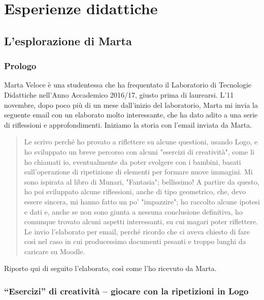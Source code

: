 \part{Esperienze didattiche} \label{parte:esperienze-didattiche}

\chapter{L'esplorazione di Marta} \label{cap:marta}

\section{Prologo}

Marta Veloce è una studentessa che ha frequentato il Laboratorio di Tecnologie
Didattiche nell'Anno Accademico 2016/17, giusto prima di laurearsi. L'11
novembre, dopo poco più di un mese dall'inizio del laboratorio, Marta mi
invia la seguente email con un elaborato molto interessante, che ha dato adito
a una serie di riflessioni e approfondimenti. Iniziamo la storia con l'email
inviata da Marta.

\begin{quote} Le scrivo perché ho provato a riflettere su alcune questioni,
	usando Logo, e ho sviluppato un breve percorso con alcuni "esercizi di
	creatività", come li ho chiamati io, eventualmente da poter svolgere
	con i bambini, basati sull'operazione di ripetizione di elementi per
	formare nuove immagini. Mi sono ispirata al libro di Munari\cite{Munari},
	"Fantasia"; bellissimo! A partire da questo, ho poi sviluppato alcune
	riflessioni, anche di tipo geometrico, che, devo essere sincera, mi
	hanno fatto un po' "impazzire"; ho raccolto alcune ipotesi e dati e,
	anche se non sono giunta a nessuna conclusione definitiva, ho comunque
	trovato alcuni aspetti interessanti, su cui magari poter riflettere. Le
	invio l'elaborato per email, perché ricordo che ci aveva chiesto di
	fare così nel caso in cui producessimo documenti pesanti e troppo
	lunghi da caricare su Moodle.    \end{quote}

Riporto qui di seguito l'elaborato, così come l'ho ricevuto da Marta.

\section{“Esercizi” di creatività – giocare con la ripetizioni in Logo}

